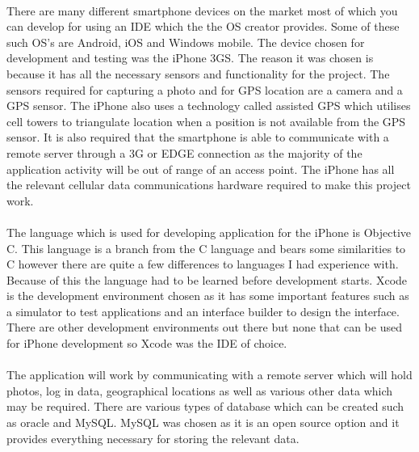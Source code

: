 \documentclass[12pt]{article}
\begin{document}
\paragraph{}
\label{par:2par}
There are many different smartphone devices on the market most of which you can develop for using an IDE which the the OS creator provides. Some of these such OS's are Android, iOS and Windows mobile. 
The device chosen for development and testing was the iPhone 3GS. The reason it was chosen is because it has all the necessary sensors and functionality for the project. The sensors required for capturing a photo and for GPS location are a camera and a GPS sensor. The iPhone also uses a technology called assisted GPS which utilises cell towers to triangulate location when a position is not available from the GPS sensor. It is also required that the smartphone is able to communicate with a remote server through a 3G or EDGE connection as the majority of the application activity will be out of range  of an access point. The iPhone has all the relevant cellular data communications hardware required to make this project work.

\paragraph{}
\label{par:2par}
The language which is used for developing application for the iPhone is Objective C. This language is a branch from the C language and bears some similarities to C however there are quite a few differences to languages I had experience with. Because of this the language had to be learned before development starts.
Xcode is the development environment chosen as it has some important features such as a simulator to test applications and an interface builder to design the interface. There are other development environments out there but none that can be used for iPhone development so Xcode was the IDE of choice.

\paragraph{}
\label{par:2par}

The application will work by communicating with a remote server which will hold photos, log in data, geographical locations as well as various other data which may be required.  There are various types of database which can be created such as oracle and MySQL. MySQL was chosen as it is an open source option and it provides everything necessary for storing the relevant data.
\end{document}
